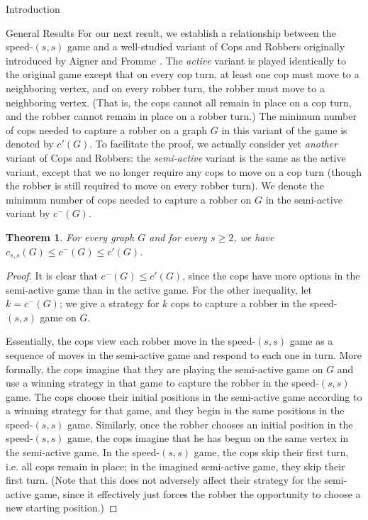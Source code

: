 \documentclass[12pt]{amsart}
\newtheorem{theorem}[lemma]{Theorem}
\theoremstyle{definition}
\newcommand{\speed}[1]{c_{#1,#1}}
\begin{document}
\begin{section}{Introduction}
\begin{section}{General Results}
For our next result, we establish a relationship between the speed-$(s,s)$ game and a well-studied variant of Cops and Robbers originally introduced by Aigner and Fromme \cite{AF84}.  The \textit{active} variant is played identically to the original game except that on every cop turn, at least one cop must move to a neighboring vertex, and on every robber turn, the robber must move to a neighboring vertex.  (That is, the cops cannot all remain in place on a cop turn, and the robber cannot remain in place on a robber turn.)  The minimum number of cops needed to capture a robber on a graph $G$ in this variant of the game is denoted by $c'(G)$.  To facilitate the proof, we actually consider yet \textit{another} variant of Cops and Robbers: the \textit{semi-active} variant is the same as the active variant, except that we no longer require any cops to move on a cop turn (though the robber is still required to move on every robber turn).  We denote the minimum number of cops needed to capture a robber on $G$ in the semi-active variant by $c^-(G)$.  

\begin{theorem}\label{thm:speed_s_active}
For every graph $G$ and for every $s \ge 2$, we have $\speed{s}(G) \le c^-(G) \le c'(G)$.
\end{theorem}
\begin{proof}
It is clear that $c^-(G) \le c'(G)$, since the cops have more options in the semi-active game than in the active game.  For the other inequality, let $k = c^-(G)$; we give a strategy for $k$ cops to capture a robber in the speed-$(s,s)$ game on $G$.  

Essentially, the cops view each robber move in the speed-$(s,s)$ game as a sequence of moves in the semi-active game and respond to each one in turn.  More formally, the cops imagine that they are playing the semi-active game on $G$ and use a winning strategy in that game to capture the robber in the speed-$(s,s)$ game.  The cops choose their initial positions in the semi-active game according to a winning strategy for that game, and they begin in the same positions in the speed-$(s,s)$ game.  Similarly, once the robber chooses an initial position in the speed-$(s,s)$ game, the cops imagine that he has begun on the same vertex in the semi-active game. In the speed-$(s,s)$ game, the cops skip their first turn, i.e. all cops remain in place; in the imagined semi-active game, they skip their first turn.  (Note that this does not adversely affect their strategy for the semi-active game, since it effectively just forces the robber the opportunity to choose a new starting position.)  


\end{proof}
\end{section}
\end{section}
\end{document}
